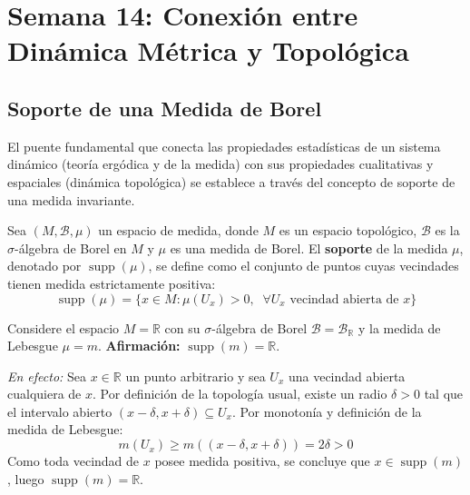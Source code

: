 
\chapter{Semana 14: Conexión entre Dinámica Métrica y Topológica}

\section{Soporte de una Medida de Borel}

El puente fundamental que conecta las propiedades estadísticas de un sistema dinámico (teoría ergódica y de la medida) con sus propiedades cualitativas y espaciales (dinámica topológica) se establece a través del concepto de soporte de una medida invariante.

\begin{definicion}
	Sea $(M, \mathcal{B}, \mu)$ un espacio de medida, donde $M$ es un espacio topológico, $\mathcal{B}$ es la $\sigma$-álgebra de Borel en $M$ y $\mu$ es una medida de Borel. El \textbf{soporte} de la medida $\mu$, denotado por $\operatorname{supp}(\mu)$, se define como el conjunto de puntos cuyas vecindades tienen medida estrictamente positiva:
	$$ \operatorname{supp}(\mu) = \{ x \in M : \mu(U_x) > 0, \;\; \forall U_x \text{ vecindad abierta de } x \} $$
\end{definicion}

\begin{ejemplo}
	Considere el espacio $M = \mathbb{R}$ con su $\sigma$-álgebra de Borel $\mathcal{B} = \mathcal{B}_{\mathbb{R}}$ y la medida de Lebesgue $\mu = m$.
	\textbf{Afirmación:} $\operatorname{supp}(m) = \mathbb{R}$.
	
	\textit{En efecto:} Sea $x \in \mathbb{R}$ un punto arbitrario y sea $U_x$ una vecindad abierta cualquiera de $x$. Por definición de la topología usual, existe un radio $\delta > 0$ tal que el intervalo abierto $(x-\delta, x+\delta) \subseteq U_x$. Por monotonía y definición de la medida de Lebesgue:
	$$ m(U_x) \ge m((x-\delta, x+\delta)) = 2\delta > 0 $$
	Como toda vecindad de $x$ posee medida positiva, se concluye que $x \in \operatorname{supp}(m)$, luego $\operatorname{supp}(m) = \mathbb{R}$.
\end{ejemplo}

